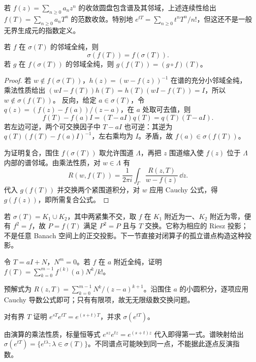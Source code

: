 若 $f(z)=\sum_{n\ge0}a_nz^n$ 的收敛圆盘包含谱及其邻域，上述连续性给出 $f(T)=\sum_{n\ge0}a_nT^n$ 的范数收敛。特别地
$e^{tT}=\sum_{n\ge0}t^nT^n/n!$，但这还不是一般无界生成元的指数定义。

\begin{theorem}[谱映射与复合]\label{thm:y8-spectral-mapping}
若 $f$ 在 $\sigma(T)$ 的邻域全纯，则
\begin{equation}\label{eq:y8-spectral-mapping}
 \sigma(f(T))=f(\sigma(T)).
\end{equation}
若 $g$ 在 $f(\sigma(T))$ 的邻域全纯，则 $g(f(T))=(g\circ f)(T)$。
\end{theorem}
\begin{proof}
若 $w\notin f(\sigma(T))$，$h(z)=(w-f(z))^{-1}$ 在谱的充分小邻域全纯，乘法性质给出 $(wI-f(T))h(T)=h(T)(wI-f(T))=I$，所以 $w\notin\sigma(f(T))$。
反向，给定 $a\in\sigma(T)$，令
$q(z)=(f(z)-f(a))/(z-a)$，在 $a$ 处取可去值，则
\[
 f(T)-f(a)I=(T-aI)q(T)=q(T)(T-aI).
\]
若左边可逆，两个可交换因子中 $T-aI$ 也可逆：其逆为 $q(T)(f(T)-f(a)I)^{-1}$，左右乘均为 $I$。矛盾，故 $f(a)\in\sigma(f(T))$。

为证明复合，围住 $f(\sigma(T))$ 取允许围道 $\Lambda$，再把 $z$ 围道缩入使 $f(z)$ 位于 $\Lambda$ 内部的谱邻域。由乘法性质，对 $w\in\Lambda$ 有
\[
 R(w,f(T))=\frac1{2\pi i}\int_\Gamma
 \frac{R(z,T)}{w-f(z)}\,\dd z.
\]
代入 $g(f(T))$ 并交换两个紧围道积分，对 $w$ 应用 Cauchy 公式，得 $g(f(z))$，即所需复合公式。
\end{proof}

\begin{example}[分离两块谱]
若 $\sigma(T)=K_1\cup K_2$，其中两紧集不交，取 $f$ 在 $K_1$ 附近为一、$K_2$ 附近为零，便有 $f^2=f$，故 $P=f(T)$ 满足 $P^2=P$ 且与 $T$ 交换。它称为相应的 Riesz 投影；不是任意 Banach 空间上的正交投影。下一节直接对闭算子的孤立谱点构造这种投影。
\end{example}

\begin{exercise}\label{ex:y8-jordan-function}
令 $T=aI+N$，$N^m=0$。若 $f$ 在 $a$ 附近全纯，证明
$f(T)=\sum_{k=0}^{m-1}f^{(k)}(a)N^k/k!$。
\end{exercise}
\begin{solution}
预解式为 $R(z,T)=\sum_{k=0}^{m-1}N^k/(z-a)^{k+1}$。沿围住 $a$ 的小圆积分，逐项应用 Cauchy 导数公式即可；只有有限项，故无无限级数交换问题。
\end{solution}

\begin{exercise}[指数与谱]\label{ex:y8-exponential}
对有界 $T$ 证明 $e^{sT}e^{tT}=e^{(s+t)T}$，并求 $\sigma(e^{tT})$。
\end{exercise}
\begin{solution}
由演算的乘法性质，标量恒等式 $e^{sz}e^{tz}=e^{(s+t)z}$ 代入即得第一式。谱映射给出 $\sigma(e^{tT})=\{e^{t\lambda}:\lambda\in\sigma(T)\}$。不同谱点可能映到同一点，不能据此逐点反演指数。
\end{solution}

